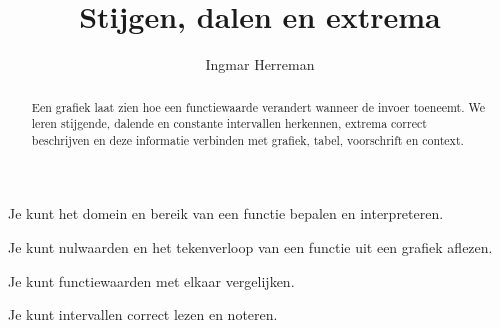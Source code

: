 \documentclass{ximera}
\title{Stijgen, dalen en extrema}
\author{Ingmar Herreman}
\begin{document}





\begin{abstract}
Een grafiek laat zien hoe een functiewaarde verandert wanneer de invoer toeneemt.
We leren stijgende, dalende en constante intervallen herkennen, extrema correct
beschrijven en deze informatie verbinden met grafiek, tabel, voorschrift en context.
\end{abstract}

\maketitle

\begin{voorkennis}

  \item Je kunt het domein en bereik van een functie bepalen en interpreteren.

  \item Je kunt nulwaarden en het tekenverloop van een functie uit een grafiek aflezen.

  \item Je kunt functiewaarden met elkaar vergelijken.

  \item Je kunt intervallen correct lezen en noteren.

\end{voorkennis}
\end{document}

